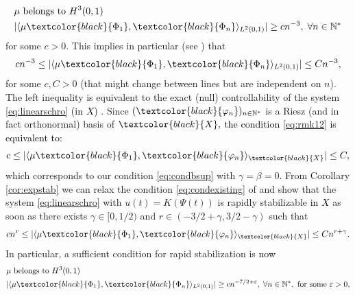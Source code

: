 \documentclass[11pt, dvipsnames]{amsart}
\begin{document}
\begin{equation}
\label{eq:condexisting}
\begin{split}
    &\mu\text{ belongs to }H^{3}(0,1)\\
    &|\langle\mu\textcolor{black}{\Phi_{1}},\textcolor{black}{\Phi_{n}}\rangle_{L^{2}(0,1)}|\geq c n^{-3},\;\forall n \in\mathbb{N}^{*}
    \end{split}
\end{equation}
for some $c>0$.
This implies in particular (see \cite[Remark 1.2]{Coron2018-rapid}) that 
\begin{equation}
\label{eq:rmk12}
    c n^{-3}\leq |\langle\mu\textcolor{black}{\Phi_{1}},\textcolor{black}{\Phi_{n}}\rangle_{L^{2}(0,1)}|\leq C n^{-3},
\end{equation}
for some $c,C >0$ (that might change between lines but are independent on $n$). The left inequality is equivalent to the exact (null) controllability of the system \eqref{eq:linearschro} \textcolor{black}{(in $X$)} \cite{Coron2018-rapid}. Since $(\textcolor{black}{{\varphi}_{n}})_{n\in\mathbb{N}^{*}}$ is a Riesz (and in fact orthonormal) basis of $\textcolor{black}{X},$ \textcolor{black}{the condition \eqref{eq:rmk12} is equivalent to:}
\begin{equation}
    c \leq |\langle\mu\textcolor{black}{\Phi_{1}},\textcolor{black}{{\varphi}_{n}}\rangle_{\textcolor{black}{X}}|\leq C,
\end{equation}
which corresponds to our condition \eqref{eq:condbsup} with $\gamma=\beta=0$. From Corollary \ref{cor:expstab} we can relax the condition \eqref{eq:condexisting} of \cite{Coron2018-rapid,Gagnon2022-fredholm} and show that the system \eqref{eq:linearschro} with $u(t) = K(\Psi(t))$ is rapidly stabilizable \textcolor{black}{in $X$} as soon as there exists $\gamma\in [0,1/2)$ and $r\in(-3/2+\gamma,3/2-\gamma)$ such that
\begin{equation}
        c n^{r} \leq |\langle\mu\textcolor{black}{\Phi_{1}},\textcolor{black}{\varphi_{n}}\rangle_{\textcolor{black}{X}}|\leq C n^{r+\gamma}.
\end{equation}
In particular, a sufficient condition for rapid stabilization is \textcolor{black}{now}
\begin{equation}
\begin{split}
    &\mu\text{ belongs to }H^{3}(0,1)\\
    &|\langle\mu\textcolor{black}{\Phi_{1}},\textcolor{black}{\Phi_{n}}\rangle_{L^{2}(0,1)}|\geq c n^{-7/2+\varepsilon},\;\forall n \in\mathbb{N}^{*}, \text{ for some }\varepsilon>0,
\end{split}
\end{equation}
\end{document}

